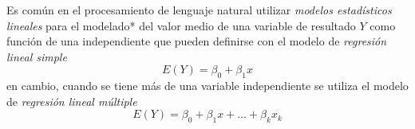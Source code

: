 Es común en el procesamiento de lenguaje natural utilizar \emph{modelos estadísticos lineales} para el modelado* del valor medio de una variable de resultado $Y$ como función de una independiente que pueden definirse con el modelo de \emph{regresión lineal simple}
\begin{equation}
E(Y)=\beta_0+\beta_1x
\end{equation}
en cambio, cuando se tiene más de una variable independiente se utiliza el modelo de \emph{regresión lineal múltiple}
\begin{equation}
E(Y)=\beta_0+\beta_1x+\ldots+\beta_kx_k
\end{equation}